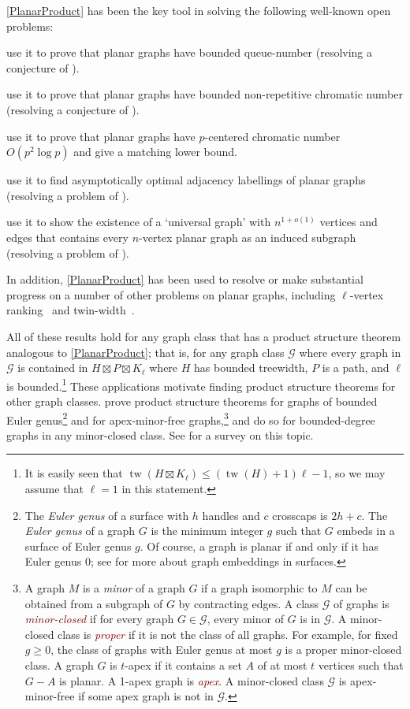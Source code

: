 \documentclass{patmorin}
\theoremstyle{plain}
\theoremstyle{definition}
\newcommand{\defin}[1]{\textcolor{Maroon}{\emph{#1}}}
\DeclareMathOperator{\tw}{tw}
\renewcommand{\geq}{\geqslant}
\renewcommand{\leq}{\leqslant}
\begin{document}
\noindent\cref{PlanarProduct} has been the key tool in solving the following well-known open problems:
\begin{compactitem}
\item \citet{DJMMUW20} use it to prove that planar graphs have bounded queue-number (resolving a conjecture of \citet{HLR92}).
\item  \citet{dujmovic.esperet.ea:planar} use it to prove that planar graphs have bounded non-repetitive chromatic number (resolving a conjecture of \citet{AGHR-RSA02}).
\item \citet{DFMS21} use it to prove that planar graphs have $p$-centered chromatic number $O(p^2\log p)$ and give a matching lower bound.
\item \citet{DEJGMM21} use it to find asymptotically optimal adjacency labellings of planar graphs (resolving a problem of \citet{kannan.naor.ea:implicit}).
\item \citet{EJM} use it to show the existence of a `universal graph' with $n^{1+o(1)}$ vertices and edges that contains every $n$-vertex planar graph as an induced subgraph (resolving a problem of \citet{babai.chung.ea:on}).
\end{compactitem}
In addition, \cref{PlanarProduct} has been used to resolve or make substantial progress on a number of other problems on planar graphs, including $\ell$-vertex ranking~\citep{BDJM} and twin-width~\citep{BKW}.


All of these results hold for any graph class that has a product structure theorem analogous to \cref{PlanarProduct}; that is, for any graph class  $\mathcal{G}$ where every graph in $\mathcal{G}$ is contained in $H\boxtimes P\boxtimes K_\ell$ where $H$ has bounded treewidth, $P$ is a path, and $\ell$ is bounded.\footnote{It is easily seen that $\tw(H\boxtimes K_\ell) \leq (\tw(H)+1)\ell-1$, so we may assume that $\ell=1$ in this statement.} These applications motivate finding product structure theorems for other graph classes. \citet{DJMMUW20} prove product structure theorems for graphs of bounded Euler genus\footnote{The \textit{Euler genus} of a surface with $h$ handles and $c$ crosscaps is $2h+c$. The \textit{Euler genus} of a graph $G$ is the minimum integer $g$ such that $G$ embeds in a surface of Euler genus $g$. Of course, a graph is planar if and only if it has Euler genus 0; see \citep{mohar.thomassen:graphs} for more about graph embeddings in surfaces.} and for apex-minor-free graphs,\footnote{A graph $M$ is a \textit{minor} of a graph $G$ if a graph isomorphic to $M$ can be obtained from a subgraph of $G$ by contracting edges. A class $\mathcal{G}$ of graphs is \defin{minor-closed} if for every graph $G\in\mathcal{G}$, every minor of $G$ is in $\mathcal{G}$. A minor-closed class is \defin{proper} if it is not the class of all graphs. For example, for fixed $g\geq 0$, the class of graphs with Euler genus at most $g$ is a proper minor-closed class. A graph $G$ is $t$-apex if it contains a set $A$ of at most $t$ vertices such that $G-A$ is planar. A 1-apex graph is \defin{apex}.  A minor-closed class $\mathcal{G}$ is apex-minor-free if some apex graph is not in $\mathcal{G}$.} and \citet{DEMWW22} do so for bounded-degree graphs in any minor-closed class. See \citep{DHJLW21} for a survey on this topic.
\end{document}

